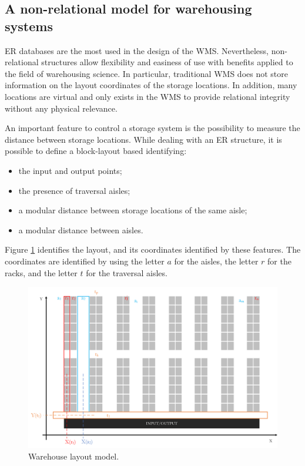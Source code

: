 \subsection{A non-relational model for warehousing systems} \label{secNonRelStructWh}

ER databases are the most used in the design of the WMS. Nevertheless, non-relational structures allow flexibility and easiness of use with benefits applied to the field of warehousing science. In particular, traditional WMS does not store information on the layout coordinates of the storage locations. In addition, many locations are virtual and only exists in the WMS to provide relational integrity without any physical relevance. \par

An important feature to control a storage system is the possibility to measure the distance between storage locations. While dealing with an ER structure, it is possible to define a block-layout based identifying:

\begin{itemize}
    \item the input and output points;
    \item the presence of traversal aisles;
    \item a modular distance between storage locations of the same aisle;
    \item a modular distance between aisles.
\end{itemize}

Figure \ref{fig_layout_wh} identifies the layout, and its coordinates identified by these features. The coordinates are identified by using the letter $a$ for the aisles, the letter $r$ for the racks, and the letter $t$ for the traversal aisles.

\begin{figure}[hbt!]
\centering
\includegraphics[width=1\textwidth]{SectionWarehouses/diagnsticModels_figures/fig_layout.png}
\captionsetup{type=figure}
\caption{Warehouse layout model.}
\label{fig_layout_wh}
\end{figure}

